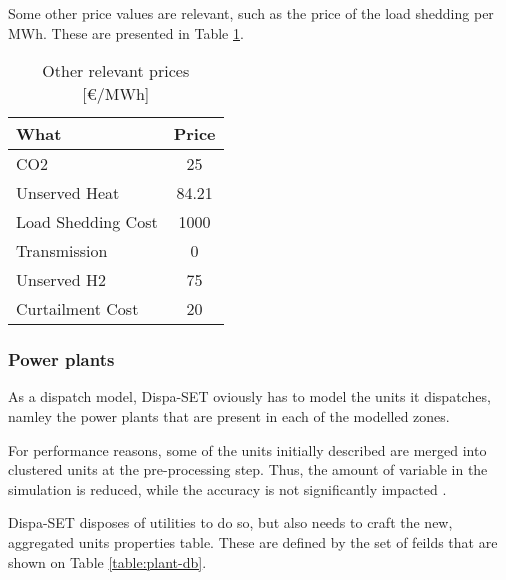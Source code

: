 Some other price values are relevant, such as the price of the load shedding per MWh. These are presented in Table \ref{table:other-prices}.

\begin{table}[h]
    \centering
	\begin{tabular}{|l c|}
		\hline
		What & Price \\
		\hline
		CO2                & 25 \\
		Unserved Heat      & 84.21\\
		Load Shedding Cost & 1000\\
		Transmission       & 0\\
		Unserved H2        & 75\\
		Curtailment Cost   & 20 \\
		\hline
	\end{tabular}
	\caption{Other relevant prices [€/MWh]}
	\label{table:other-prices}
\end{table}

\subsubsection{Power plants}

As a dispatch model, Dispa-SET oviously has to model the units it dispatches, namley the power plants that are present in each of the modelled zones.

For performance reasons, some of the units initially described are merged into clustered units at the pre-processing step. Thus, the amount of variable in the simulation is reduced, while the accuracy is not significantly impacted \cite{dispaset}.

Dispa-SET disposes of utilities to do so, but also needs to craft the new, aggregated units properties table. These are defined by the set of feilds that are shown on Table \ref{table:plant-db}.

